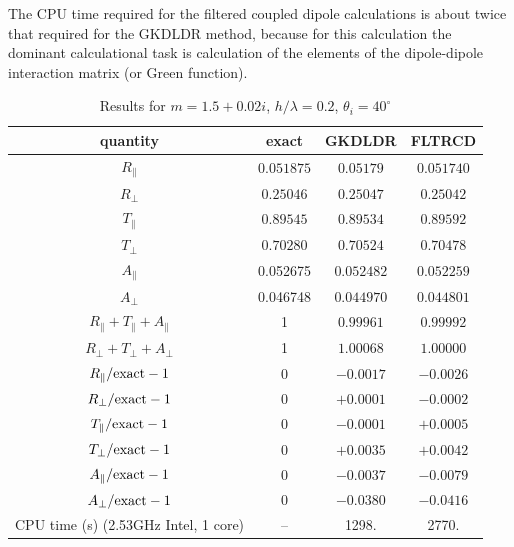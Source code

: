 The CPU time required for the filtered coupled dipole calculations is
about twice that required for the GKDLDR method, because for this
calculation the dominant calculational task is calculation of the
elements of the dipole-dipole interaction matrix (or Green function).

\begin{table}[h]
\begin{center}
\caption{\label{tab:GKDLDR_vs_FLTRCD}Results for $m=1.5+0.02i$, $h/\lambda=0.2$, $\theta_i=40^\circ$}
{\footnotesize
\begin{tabular}{c c c c}
\hline
quantity                    & exact    & GKDLDR   & FLTRCD   \tabularnewline
\hline
$R_\parallel$               & $0.051875$ & $0.05179$ & $0.051740$\tabularnewline
$R_\perp$                   & $0.25046$  & $0.25047$ & $0.25042$ \tabularnewline
$T_\parallel$               & $0.89545$  & $0.89534$ & $0.89592$ \tabularnewline
$T_\perp$                   & $0.70280$  & $0.70524$ & $0.70478$ \tabularnewline
$A_\parallel$               & 0.052675 & $0.052482$ & $0.052259$ \tabularnewline
$A_\perp$                   & 0.046748 & $0.044970$ & $0.044801$ \tabularnewline
$R_\parallel+T_\parallel+A_\parallel$
                            & 1        & $0.99961$  & $0.99992$ \tabularnewline
$R_\perp+T_\perp+A_\perp$   & 1        & $1.00068$  & $1.00000$ \tabularnewline
\hline
$R_\parallel/{\rm exact}-1$ & 0         & $-0.0017$ & $-0.0026$ \tabularnewline
$R_\perp/{\rm exact}-1$     & 0        & $+0.0001$ & $-0.0002$ \tabularnewline
$T_\parallel/{\rm exact}-1$ & 0        & $-0.0001$ & $+0.0005$ \tabularnewline
$T_\perp/{\rm exact}-1$     & 0        & $+0.0035$ & $+0.0042$ \tabularnewline
$A_\parallel/{\rm exact}-1$ & 0        & $-0.0037$ & $-0.0079$ \tabularnewline
$A_\perp/{\rm exact}-1$     & 0        & $-0.0380$ & $-0.0416$ \tabularnewline
\hline
CPU time (s) (2.53GHz Intel, 1 core)           & --       & 1298.     & 2770. \tabularnewline
\hline
\end{tabular}
}
\end{center}
\end{table}

